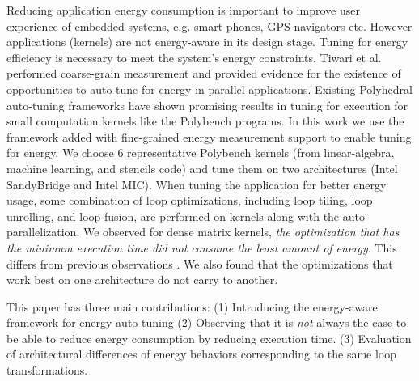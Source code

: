 Reducing application energy consumption is important to improve user experience of 
embedded systems, e.g. smart phones, GPS navigators etc.  
However applications (kernels) are not energy-aware in its design stage. Tuning
for energy efficiency is necessary to meet the system's energy constraints.
Tiwari et al. performed coarse-grain measurement and provided evidence for the 
existence of opportunities to auto-tune for energy in parallel applications\cite{Tiwari:EnergyAutoTune}.
Existing Polyhedral auto-tuning frameworks have shown promising results in tuning for execution
for small computation kernels like the Polybench programs\cite{EJ2012}. 
In this work we use the framework added with fine-grained energy measurement support to enable tuning for energy.
We choose 6 representative Polybench kernels (from linear-algebra, machine learning, and stencils code) 
and tune them on two architectures (Intel SandyBridge and Intel MIC).
When tuning the application for better energy usage, some combination of loop optimizations, including loop 
tiling, loop unrolling, and loop fusion, are performed on kernels along with the auto-parallelization.
We observed for dense matrix kernels, \emph{the optimization that has the minimum execution time 
did not consume the least amount of energy}. This differs from previous observations \cite{Wang2014}.
We also found that the optimizations that work best on one architecture do not carry to another.  
 
This paper has three main contributions: 
(1) Introducing the energy-aware framework for energy auto-tuning
(2) Observing that it is \emph{not} always the case to be able to reduce energy consumption by reducing execution time.
(3) Evaluation of architectural differences of energy behaviors corresponding to the same loop transformations.

%
